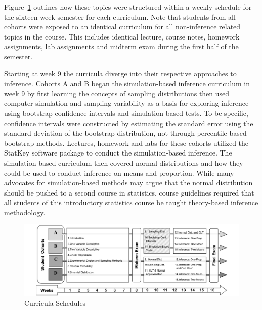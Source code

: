 Figure~\ref{fig:CurricSched} outlines how these topics were structured within a weekly schedule for the sixteen week semester for each curriculum.  Note that students from all cohorts were exposed to an identical curriculum for all non-inference related topics in the course. This includes identical lecture, course notes, homework assignments, lab assignments and midterm exam during the first half of the semester.

Starting at week 9 the curricula diverge into their respective approaches to inference.  Cohorts A and B began the simulation-based inference curriculum in week 9 by first learning the concepts of sampling distributions then used computer simulation and sampling variability as a basis for exploring inference using bootstrap confidence intervals and simulation-based tests.  To be specific, confidence intervals were constructed by estimating the standard error using the standard deviation of the bootstrap distribution, not through percentile-based bootstrap methods.  Lectures, homework and labs for these cohorts utilized the StatKey software package \citep{Lock5} to conduct the simulation-based inference. The simulation-based curriculum then covered normal distributions and how they could be used to conduct inference on means and proportion.  While many advocates for simulation-based methods may argue that the normal distribution should be pushed to a second course in statistics, course guidelines required that all students of this introductory statistics course be taught theory-based inference methodology.  

\begin{figure}[hbtp]
\centering
\includegraphics[keepaspectratio=true, width=1\textwidth]{figure/CurriculaPaths2.pdf}
\caption{\label{fig:CurricSched} Curricula Schedules}
\end{figure}

